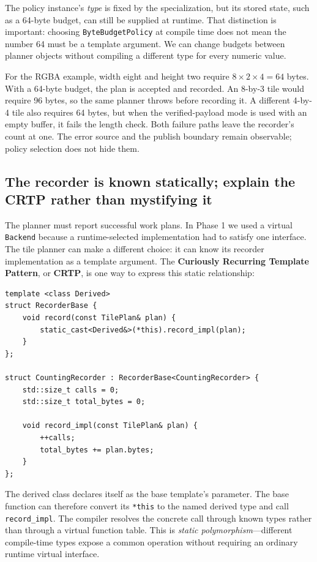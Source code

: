 The policy instance's \emph{type} is fixed by the specialization, but its stored state, such as a 64-byte budget, can still be supplied at runtime. That distinction is important: choosing \texttt{ByteBudgetPolicy} at compile time does not mean the number 64 must be a template argument. We can change budgets between planner objects without compiling a different type for every numeric value.

For the RGBA example, width eight and height two require \(8\times2\times4=64\) bytes. With a 64-byte budget, the plan is accepted and recorded. An 8-by-3 tile would require 96 bytes, so the same planner throws before recording it. A different 4-by-4 tile also requires 64 bytes, but when the verified-payload mode is used with an empty buffer, it fails the length check. Both failure paths leave the recorder's count at one. The error source and the publish boundary remain observable; policy selection does not hide them.

\subsection{The recorder is known statically; explain the CRTP rather than mystifying it}\label{05-engine-i-ch005-the-recorder-is-known-statically-explain-the-crtp-rather-than-mystifying-it}

The planner must report successful work plans. In Phase 1 we used a virtual \texttt{Backend} because a runtime-selected implementation had to satisfy one interface. The tile planner can make a different choice: it can know its recorder implementation as a template argument. The \textbf{Curiously Recurring Template Pattern}, or \textbf{CRTP}, is one way to express this static relationship:

\begin{verbatim}
template <class Derived>
struct RecorderBase {
    void record(const TilePlan& plan) {
        static_cast<Derived&>(*this).record_impl(plan);
    }
};

struct CountingRecorder : RecorderBase<CountingRecorder> {
    std::size_t calls = 0;
    std::size_t total_bytes = 0;

    void record_impl(const TilePlan& plan) {
        ++calls;
        total_bytes += plan.bytes;
    }
};
\end{verbatim}

The derived class declares itself as the base template's parameter. The base function can therefore convert its \texttt{*this} to the named derived type and call \texttt{record\_impl}. The compiler resolves the concrete call through known types rather than through a virtual function table. This is \emph{static polymorphism}---different compile-time types expose a common operation without requiring an ordinary runtime virtual interface.

